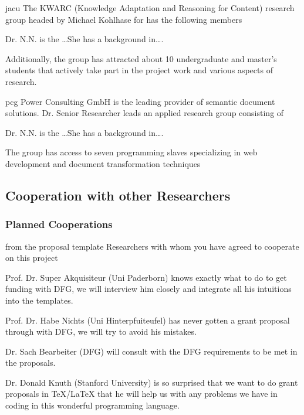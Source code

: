 \begin{sitedescription}{jacu}
  The KWARC (Knowledge Adaptation and Reasoning for Content) research group headed by
  Michael Kohlhase for has the following members
  \begin{compactdesc}
  \item[Dr. N.N.] is the \ldots She has a background in\ldots.
  \end{compactdesc}
  Additionally, the group has attracted about 10 undergraduate and master's students that
  actively take part in the project work and various aspects of research.
\end{sitedescription}

\begin{sitedescription}{pcg}
  Power Consulting GmbH is the leading provider of semantic document solutions. Dr. Senior
  Researcher leads an applied research group consisting of
  \begin{compactdesc}
  \item[Dr. N.N.] is the \ldots She has a background in\ldots.
  \end{compactdesc}
  The group has access to seven programming slaves specializing in web development and
  document transformation techniques
\end{sitedescription}


\subsection{Cooperation with other Researchers}

\subsubsection{Planned Cooperations}
\begin{todo}{from the proposal template}
  Researchers with whom you have agreed to cooperate on this project
\end{todo}
\begin{compactdesc}
\item[Prof. Dr. Super Akquisiteur (Uni Paderborn)] knows exactly what to do to get funding
  with DFG, we will interview him closely and integrate all his intuitions into the {\pn}
  templates.
\item[Prof. Dr. Habe Nichts (Uni Hinterpfuiteufel)] has never gotten a grant proposal
  through with DFG, we will try to avoid his mistakes.
\item[Dr. Sach Bearbeiter (DFG)] will consult with the DFG requirements to be met in the
  proposals.
\item[Dr. Donald Knuth (Stanford University)] is so surprised that we want to do grant
  proposals in {\TeX/\LaTeX} that he will help us with any problems we have in coding in
  this wonderful programming language.
\end{compactdesc}

